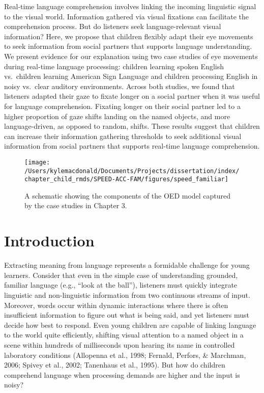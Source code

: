 \documentclass[oneside]{report}
\begin{document}
Real-time language comprehension involves linking the incoming
linguistic signal to the visual world. Information gathered via visual
fixations can facilitate the comprehension process. But do listeners
seek language-relevant visual information? Here, we propose that
children flexibly adapt their eye movements to seek information from
social partners that supports language understanding. We present
evidence for our explanation using two case studies of eye movements
during real-time language processing: children learning spoken English
vs.~children learning American Sign Language and children processing
English in noisy vs.~clear auditory environments. Across both studies,
we found that listeners adapted their gaze to fixate longer on a social
partner when it was useful for language comprehension. Fixating longer
on their social partner led to a higher proportion of gaze shifts
landing on the named objects, and more language-driven, as opposed to
random, shifts. These results suggest that children can increase their
information gathering thresholds to seek additional visual information
from social partners that supports real-time language comprehension.
\begin{figure}[!t]

{\centering \texttt{[image: /Users/kylemacdonald/Documents/Projects/dissertation/index/chapter\_child\_rmds/SPEED-ACC-FAM/figures/speed\_familiar]} 

}

\caption[Overview of Chapter 3.]{A schematic showing the components of the OED model captured by the case studies in Chapter 3.}\label{fig:schematic-speed-fam}
\end{figure}
\section{Introduction}\label{introduction-2}

Extracting meaning from language represents a formidable challenge for
young learners. Consider that even in the simple case of understanding
grounded, familiar language (e.g., ``look at the ball''), listeners must
quickly integrate linguistic and non-linguistic information from two
continuous streams of input. Moreover, words occur within dynamic
interactions where there is often insufficient information to figure out
what is being said, and yet listeners must decide how best to respond.
Even young children are capable of linking language to the world quite
efficiently, shifting visual attention to a named object in a scene
within hundreds of milliseconds upon hearing its name in controlled
laboratory conditions (Allopenna et al., 1998; Fernald, Perfors, \&
Marchman, 2006; Spivey et al., 2002; Tanenhaus et al., 1995). But how do
children comprehend language when processing demands are higher and the
input is noisy?
\end{document}
